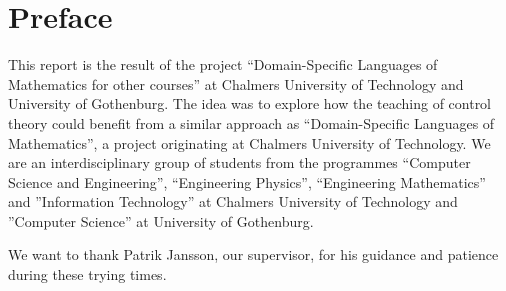 \section*{Preface}
\thispagestyle{empty}

This report is the result of the project ``Domain-Specific Languages of Mathematics for other courses'' at Chalmers University of Technology and University of Gothenburg. The idea was to explore how the teaching of control theory  could benefit from a similar approach as ``Domain-Specific Languages of Mathematics'', a project originating at Chalmers University of Technology. 
We are an interdisciplinary group of students from the programmes ``Computer Science and Engineering'', ``Engineering Physics'', ``Engineering Mathematics'' and ''Information Technology'' at Chalmers University of Technology and ''Computer Science'' at University of Gothenburg. 

We want to thank Patrik Jansson, our supervisor, for his guidance and patience during these trying times. 






\iffalse
Tack till de ändlösa timmar som lagts till plugg. Tack till de sömnlösa nätter innan tentamen. Tack till de veckar som vankats i väntan på betygssvar. Ni har gett oss inspirationen för att få detta projekt färdigställt.
Tack.
\fi


